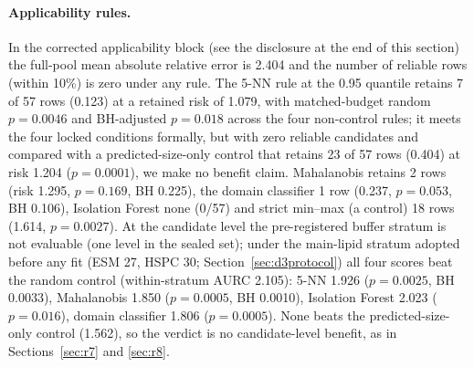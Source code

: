 \documentclass[11pt,a4paper]{article}
\begin{document}
\paragraph{Applicability rules.} In the corrected applicability block
(see the disclosure at the end of this section) the full-pool mean absolute relative error is
2.404 and the number of reliable rows (within 10\%) is zero under any rule.
The 5-NN rule at the 0.95 quantile retains 7 of 57 rows (0.123) at a
retained risk of 1.079, with matched-budget random $p=0.0046$ and
BH-adjusted $p=0.018$ across the four non-control rules; it meets the four locked conditions
formally, but with zero reliable candidates and compared with a predicted-size-only
control that retains 23 of 57 rows (0.404) at risk 1.204 ($p=0.0001$), we
make no benefit claim. Mahalanobis retains 2 rows (risk 1.295, $p=0.169$, BH
0.225), the domain classifier 1 row (0.237, $p=0.053$, BH 0.106), Isolation
Forest none (0/57) and strict min--max (a control) 18 rows (1.614, $p=0.0027$). At the
candidate level the pre-registered buffer stratum is not evaluable (one level
in the sealed set); under the main-lipid stratum adopted before any fit (ESM 27, HSPC 30;
Section~\ref{sec:d3protocol})
all four scores beat the random control (within-stratum AURC 2.105): 5-NN
1.926 ($p=0.0025$, BH 0.0033), Mahalanobis 1.850 ($p=0.0005$, BH 0.0010),
Isolation Forest 2.023 ($p=0.016$), domain classifier 1.806 ($p=0.0005$).
None beats the predicted-size-only control (1.562), so the verdict is no
candidate-level benefit, as in Sections~\ref{sec:r7} and \ref{sec:r8}.
\end{document}
